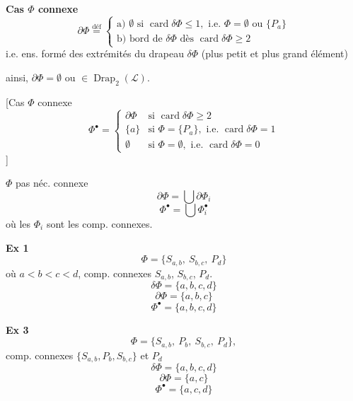 \documentclass[11pt,a4paper]{article}
\begin{document}
\textbf{Cas $\Phi$ connexe}
\[ \partial\Phi \overset{\text{déf}}{=}
\begin{cases}
\text{a) } \emptyset \text{ si } \operatorname{card}\delta\Phi\leq 1, \text{ i.e. } \Phi=\emptyset \text{ ou } \{P_a\} \\
\text{b) bord de } \delta\Phi \text{ dès } \operatorname{card}\delta\Phi\geq 2
\end{cases} \]
i.e. ens. formé des extrémités du drapeau $\delta\Phi$ (plus petit et plus grand élément)


ainsi, $\partial\Phi=\emptyset$ ou $\in\operatorname{Drap}_2(\mathcal{L})$.

[Cas $\Phi$ connexe
\[ \Phi^{\bullet} =
\begin{cases}
\partial\Phi & \text{si } \operatorname{card}\delta\Phi\geq 2 \\
\{a\} & \text{si } \Phi=\{P_a\}, \text{ i.e. } \operatorname{card}\delta\Phi=1 \\
\emptyset & \text{si } \Phi=\emptyset, \text{ i.e. } \operatorname{card}\delta\Phi=0
\end{cases} \]
]

$\Phi$ pas néc. connexe
\[ \partial\Phi = \bigcup \partial\Phi_i \]
\[ \Phi^{\bullet} = \bigcup \Phi_i^{\bullet} \]
où les $\Phi_i$ sont les comp. connexes.

\textbf{Ex 1} 
\[ \Phi = \{S_{a,b},\ S_{b,c},\ P_d\} \]
où $a<b<c<d$, comp. connexes $S_{a,b}$, $S_{b,c}$, $P_d$.
\[ \delta\Phi = \{a,b,c,d\} \]
\[ \partial\Phi = \{a,b,c\} \]
\[ \Phi^{\bullet} = \{a,b,c,d\} \]


\textbf{Ex 3}
\[ \Phi = \{S_{a,b},\ P_b,\ S_{b,c},\ P_d\}, \]
comp. connexes $\{S_{a,b}, P_b, S_{b,c}\}$ et $P_d$
\[ \delta\Phi = \{a,b,c,d\} \]
\[ \partial\Phi = \{a,c\} \]
\[ \Phi^{\bullet} = \{a,c,d\} \]
\end{document}

